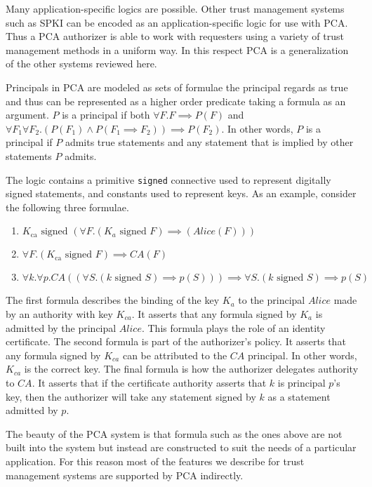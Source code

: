Many application-specific logics are possible. Other trust management
systems such as SPKI can be encoded as an application-specific logic for
use with PCA. Thus a PCA authorizer is able to work with requesters using a
variety of trust management methods in a uniform way. In this respect PCA
is a generalization of the other systems reviewed here.

Principals in PCA are modeled as sets of formulae the principal regards as
true and thus can be represented as a higher order predicate taking a
formula as an argument. $P$ is a principal if both $\forall F . F \implies
P(F)$ and $\forall F_1 \forall F_2 . ( P(F_1) \wedge P(F_1 \implies F_2) )
\implies P(F_2)$. In other words, $P$ is a principal if $P$ admits true
statements and any statement that is implied by other statements $P$
admits.

The logic contains a primitive \texttt{signed} connective used to represent
digitally signed statements, and constants used to represent keys. As an
example, consider the following three formulae.
\begin{enumerate}
\item $K_{\textrm{ca}}\,\,
\textrm{signed}\,\, (\forall F . (K_a\,\, \textrm{signed}\,\, F) \implies
(\textit{Alice}(F)))$

\item $\forall F . (K_{\textrm{ca}}\,\, \textrm{signed}\,\, F)
\implies \textit{CA}(F)$

\item $\forall k. \forall p.
  \textit{CA}((\forall S.( k\,\, \textrm{signed}\,\, S) \implies p(S)))
  \implies
  \forall S.( k\,\, \textrm{signed}\,\, S) \implies p(S)$
\end{enumerate}

The first formula describes the binding of the key $K_a$ to the principal
$\textit{Alice}$ made by an authority with key $K_{ca}$. It asserts that
any formula signed by $K_a$ is admitted by the principal $\textit{Alice}$.
This formula plays the role of an identity certificate. The second formula
is part of the authorizer's policy. It asserts that any formula signed by
$K_{ca}$ can be attributed to the $\textit{CA}$ principal. In other words,
$K_{ca}$ is the correct key. The final formula is how the authorizer
delegates authority to $\textit{CA}$. It asserts that if the certificate
authority asserts that $k$ is principal $p$'s key, then the authorizer will
take any statement signed by $k$ as a statement admitted by $p$.

The beauty of the PCA system is that formula such as the ones above are not
built into the system but instead are constructed to suit the needs of a
particular application. For this reason most of the features we describe
for trust management systems are supported by PCA indirectly. 

